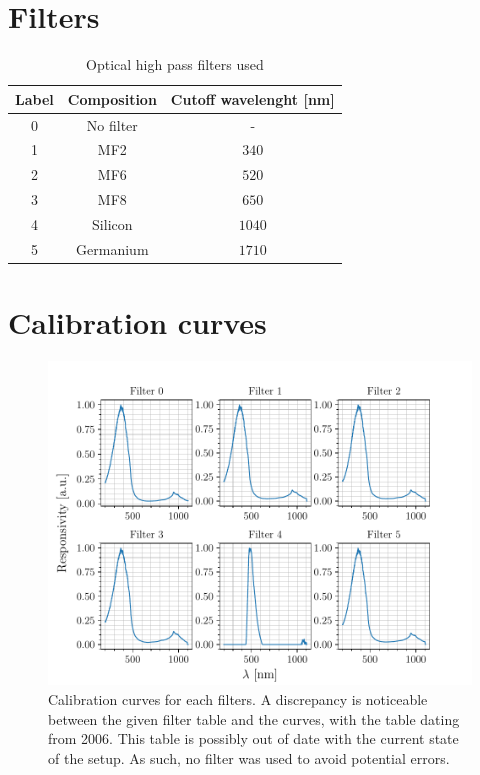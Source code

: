 \section{Filters}
\label{sec:filters}

\begin{table}[htbp]
    \centering
    \begin{tabular}{c c c}
        Label & Composition & Cutoff wavelenght [nm] \\
        \hline
        0 & No filter & - \\
        1 & MF2 & $340$ \\
        2 & MF6 & $520$ \\
        3 & MF8 & $650$ \\
        4 & Silicon & $1040$ \\
        5 & Germanium & $1710$
    \end{tabular}
    \caption{Optical high pass filters used}
    \label{tab:filters}
\end{table}

\section{Calibration curves}
\label{sec:calibration_curves}
\begin{figure}[h]
    \vspace{-0.5cm}
    \centering
    \includegraphics[scale=1]{figures/filters.pdf}
    \caption{Calibration curves for each filters. A discrepancy is noticeable between the given filter table and the curves, with the table dating from 2006. This table is possibly out of date with the current state of the setup. As such, no filter was used to avoid potential errors.}
    \label{fig:filters}
    \vspace{-1.5cm}
\end{figure}